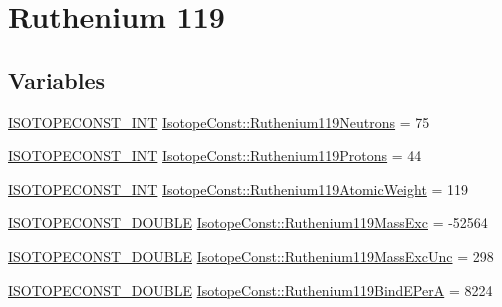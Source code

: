 \hypertarget{group___isotope_const-_ruthenium-_ru119}{}\section{Ruthenium 119}
\label{group___isotope_const-_ruthenium-_ru119}
\subsection*{Variables}
\begin{DoxyCompactItemize}
\item 
\mbox{\hyperlink{group___isotope_const-_macros_ga5f18360b3e99483a35c32d789e62621c}{I\+S\+O\+T\+O\+P\+E\+C\+O\+N\+S\+T\+\_\+\+I\+NT}} \mbox{\hyperlink{group___isotope_const-_ruthenium-_ru119_ga4dc067a95c359e6f1cb46297dcbf9ff6}{Isotope\+Const\+::\+Ruthenium119\+Neutrons}} = 75
\item 
\mbox{\hyperlink{group___isotope_const-_macros_ga5f18360b3e99483a35c32d789e62621c}{I\+S\+O\+T\+O\+P\+E\+C\+O\+N\+S\+T\+\_\+\+I\+NT}} \mbox{\hyperlink{group___isotope_const-_ruthenium-_ru119_ga6c4bb276fa00f807976b3642e6318898}{Isotope\+Const\+::\+Ruthenium119\+Protons}} = 44
\item 
\mbox{\hyperlink{group___isotope_const-_macros_ga5f18360b3e99483a35c32d789e62621c}{I\+S\+O\+T\+O\+P\+E\+C\+O\+N\+S\+T\+\_\+\+I\+NT}} \mbox{\hyperlink{group___isotope_const-_ruthenium-_ru119_ga08e00de6cc5b67d7e51a682d354ea8c8}{Isotope\+Const\+::\+Ruthenium119\+Atomic\+Weight}} = 119
\item 
\mbox{\hyperlink{group___isotope_const-_macros_ga8f45a7272ce02c0b4c65c44636ed719a}{I\+S\+O\+T\+O\+P\+E\+C\+O\+N\+S\+T\+\_\+\+D\+O\+U\+B\+LE}} \mbox{\hyperlink{group___isotope_const-_ruthenium-_ru119_gaa2db3385f869ff87053affb1fabc8429}{Isotope\+Const\+::\+Ruthenium119\+Mass\+Exc}} = -\/52564
\item 
\mbox{\hyperlink{group___isotope_const-_macros_ga8f45a7272ce02c0b4c65c44636ed719a}{I\+S\+O\+T\+O\+P\+E\+C\+O\+N\+S\+T\+\_\+\+D\+O\+U\+B\+LE}} \mbox{\hyperlink{group___isotope_const-_ruthenium-_ru119_gab2d50c9f8eb3fade2b68a5cfe90af641}{Isotope\+Const\+::\+Ruthenium119\+Mass\+Exc\+Unc}} = 298
\item 
\mbox{\hyperlink{group___isotope_const-_macros_ga8f45a7272ce02c0b4c65c44636ed719a}{I\+S\+O\+T\+O\+P\+E\+C\+O\+N\+S\+T\+\_\+\+D\+O\+U\+B\+LE}} \mbox{\hyperlink{group___isotope_const-_ruthenium-_ru119_ga4e49ea24738934787de81070d8d3dcdf}{Isotope\+Const\+::\+Ruthenium119\+Bind\+E\+PerA}} = 8224
\item 

\end{DoxyCompactItemize}
